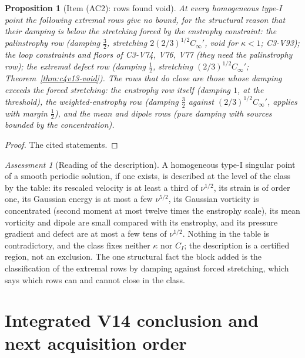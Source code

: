 \documentclass[11pt]{article}
\theoremstyle{plain}
\newtheorem{proposition}[theorem]{Proposition}
\theoremstyle{definition}
\theoremstyle{remark}
\newtheorem{assessment}[theorem]{Assessment}
\begin{document}
\begin{proposition}[Item (AC2): rows found void]
\label{prop:c4v14-void}
At every homogeneous type-I point the following extremal rows give
no bound, for the structural reason that their damping is below the
stretching forced by the enstrophy constraint: the palinstrophy row
(damping \(\frac32\), stretching \(2(2/3)^{1/2}C_\infty'\), void for \(\kappa<1\); C3-V93); the
loop constraints and floors of C3-V74, V76, V77 (they need the
palinstrophy row); the extremal defect row (damping \(\frac12\), stretching
\((2/3)^{1/2}C_\infty'\); Theorem~\ref{thm:c4v13-void}).  The rows that do close are
those whose damping exceeds the forced stretching: the enstrophy
row itself (damping \(1\), at the threshold), the weighted-enstrophy
row (damping \(\frac32\) against \((2/3)^{1/2}C_\infty'\), applies with margin \(\frac12\)), and
the mean and dipole rows (pure damping with sources bounded by the
concentration).
\end{proposition}

\begin{proof}
The cited statements.
\end{proof}

\begin{assessment}[Reading of the description]
\label{ass:c4v14-reading}
A homogeneous type-I singular point of a smooth periodic solution,
if one exists, is described at the level of the class by the table:
its rescaled velocity is at least a third of \(\nu^{1/2}\), its strain is of
order one, its Gaussian energy is at most a few \(\nu^{5/2}\), its Gaussian
vorticity is concentrated (second moment at most twelve times the
enstrophy scale), its mean vorticity and dipole are small compared
with its enstrophy, and its pressure gradient and defect are at most
a few tens of \(\nu^{1/2}\).  Nothing in the table is contradictory, and the
class fixes neither \(\kappa\) nor \(C_I\); the description is a certified region,
not an exclusion.  The one structural fact the block added is the
classification of the extremal rows by damping against forced
stretching, which says which rows can and cannot close in the class.
\end{assessment}

\section{Integrated V14 conclusion and next acquisition order}
\label{sec:c4v14-conclusion}
\end{document}
